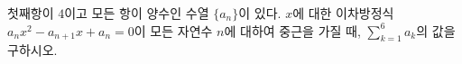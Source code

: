 \hspace*{2mm}\begin{minipage}[t]{\dimexpr\linewidth-2mm\relax}\vspace{0pt}
첫째항이 $4$이고 모든 항이 양수인 수열 $\{a_n\}$이 있다. $x$에 대한 이차방정식 $a_nx^2-a_{n+1}x+a_n=0$이 모든 자연수 $n$에 대하여 중근을 가질 때, $\displaystyle\sum_{k=1}^{6} a_k$의 값을 구하시오.\end{minipage}
